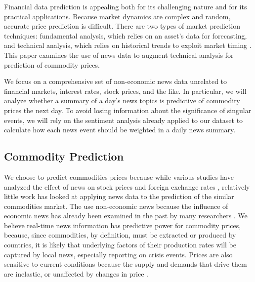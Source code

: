 Financial data prediction is appealing both for its challenging nature and for its practical applications. Because market dynamics are complex and random, accurate price prediction is difficult. There are two types of market prediction techniques: fundamental analysis, which relies on an asset's data for forecasting, and technical analysis, which relies on historical trends to exploit market timing \cite{schumaker2009textual}. This paper examines the use of news data to augment technical analysis for prediction of commodity prices.

We focus on a comprehensive set of non-economic news data unrelated to financial markets, interest rates, stock prices, and the like. In particular, we will analyze whether a summary of a day's news topics is predictive of commodity prices the next day. To avoid losing information about the significance of singular events, we will rely on the sentiment analysis already applied to our dataset to calculate how each news event should be weighted in a daily news summary.

\subsection{Commodity Prediction}
We choose to predict commodities prices because while various studies have analyzed the effect of news on stock prices \cite{mcqueen1993stock} and foreign exchange rates \cite{kamruzzaman2003svm}, relatively little work has looked at applying news data to the prediction of the similar commodities market. The use non-economic news because the influence of economic news has already been examined in the past by many researchers \cite{gidofalvi2001using}\cite{schumaker2009textual}\cite{bollen2011twitter}\cite{hagenau2012automated}. We believe real-time news information has predictive power for commodity prices, because, since commodities, by definition, must be extracted or produced by countries, it is likely that underlying factors of their production rates will be captured by local news, especially reporting on crisis events. Prices are also sensitive to current conditions because the supply and demands that drive them are inelastic, or unaffected by changes in price \cite{chen2008can}. 

